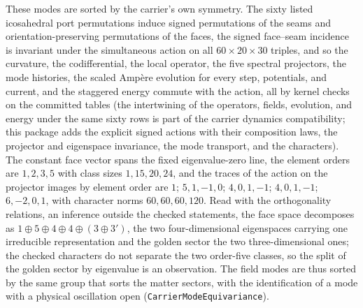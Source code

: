 \documentclass[11pt]{article}
\begin{document}
These modes are sorted by the carrier's own symmetry. The sixty listed
icosahedral port permutations induce signed permutations of the seams
and orientation-preserving permutations of the faces, the signed
face--seam incidence is invariant under the simultaneous action on all
\(60\times20\times30\) triples, and so the curvature, the codifferential,
the local operator, the five spectral projectors, the mode histories, the
scaled Amp\`ere evolution for every step, potentials, and current, and the
staggered energy commute with the action, all by kernel checks on the
committed tables (the intertwining of the operators, fields, evolution,
and energy under the same sixty rows is part of the carrier dynamics
compatibility; this package adds the explicit signed actions with their
composition laws, the projector and eigenspace invariance, the mode
transport, and the characters). The constant face vector spans the fixed
eigenvalue-zero
line, the element orders are \(1,2,3,5\) with class sizes \(1,15,20,24\),
and the traces of the action on the projector images by element order are
\(1\); \(5,1,-1,0\); \(4,0,1,-1\); \(4,0,1,-1\); \(6,-2,0,1\), with
character norms \(60,60,60,120\). Read with the orthogonality relations,
an inference outside the checked statements, the face space decomposes as \(1\oplus5\oplus4\oplus4\oplus(3\oplus3')\),
the two four-dimensional eigenspaces carrying one irreducible
representation and the golden sector the two three-dimensional ones; the
checked characters do not separate the two order-five classes, so the
split of the golden sector by eigenvalue is an observation. The field
modes are thus sorted by the same group that sorts the matter sectors,
with the identification of a mode with a physical oscillation open
(\texttt{CarrierModeEquivariance}).
\end{document}
